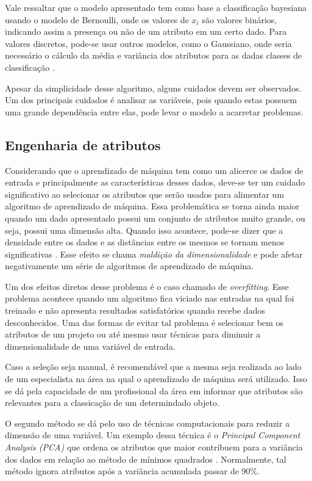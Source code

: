 Vale ressaltar que o modelo apresentado tem como base a classificação
bayesiana usando o modelo de Bernoulli, onde os valores de $x_{i}$ são valores
binários, indicando assim a presença ou não de um atributo em um certo dado.
Para valores discretos, pode-se usar outros modelos, como o Gaussiano, onde
seria necessário o cálculo da média e variância dos atributos para as dadas
classes de classificação \cite{zhang2004optimality}.

Apesar da simplicidade desse algoritmo, alguns cuidados devem ser observados.
Um dos principais cuidados é analisar as variáveis, pois quando estas possuem uma grande
dependência entre elas, pode levar o modelo a acarretar problemas.

\subsection{Engenharia de atributos}

Considerando que o aprendizado de máquina tem como um alicerce os dados de entrada
e principalmente as características desses dados, deve-se ter um cuidado
significativo ao selecionar os atributos que serão usados para alimentar um
algoritmo de aprendizado de máquina. Essa problemática se torna ainda maior
quando um dado apresentado possui um conjunto de atributos muito grande, ou
seja, possui uma dimensão alta. Quando isso acontece, pode-se dizer que a
densidade entre os dados e as distâncias entre os mesmos se tornam menos
significativas \cite{amatriain2011data}. Esse efeito se chama \textit{maldição
da dimensionalidade} e pode afetar negativamente um série de algoritmos de
aprendizado de máquina.

Um dos efeitos diretos desse problema é o caso chamado de \textit{overfitting}.
Esse problema acontece quando um algoritmo fica viciado nas entradas na qual foi
treinado e não apresenta resultados satisfatórios quando recebe dados desconhecidos.
Uma das formas de evitar tal problema é selecionar bem os atributos
de um projeto ou até mesmo usar técnicas para diminuir a dimensionalidade de uma
variável de entrada.

Caso a seleção seja manual, é recomendável que a mesma seja realizada ao lado de
um especialista na área na qual o aprendizado de máquina será utilizado. Isso se
dá pela capacidade de um profissional da área em informar que atributos são
relevantes para a classicação de um determindado objeto.

O segundo método se dá pelo uso de técnicas computacionais para reduzir a
dimensão de uma variável. Um exemplo dessa técnica é o \textit{Principal
Component Analysis (PCA) } que ordena os atributos que maior contribuem para a
variância dos dados em relação ao método de mínimos quadrados
\cite{amatriain2011data}. Normalmente, tal método ignora atributos após a
variância acumulada passar de 90\%.

